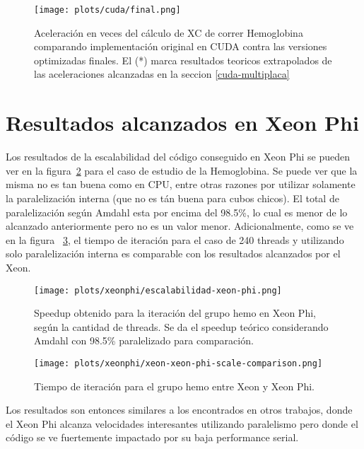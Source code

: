 \begin{figure}[htbp]
   \centering
   \texttt{[image: plots/cuda/final.png]}
   \caption{Aceleraci\'on en veces del c\'alculo de XC de correr Hemoglobina comparando implementaci\'on original en CUDA contra
   las versiones optimizadas finales. El (*) marca resultados teoricos extrapolados de las
 aceleraciones alcanzadas en la seccion \ref{cuda-multiplaca}}
   \label{fig:cuda-final}
\end{figure}


\section{Resultados alcanzados en Xeon Phi}

Los resultados de la escalabilidad del c\'odigo conseguido en Xeon Phi se pueden ver
en la figura~\ref{fig:xeon-final-scalability} para el caso de estudio de la Hemoglobina.
Se puede ver que la misma no es tan buena como en CPU, entre otras razones por utilizar
solamente la paralelizaci\'on interna (que no es t\'an buena para cubos chicos). El total de paralelizaci\'on seg\'un
Amdahl esta por encima del 98.5\%, lo cual es menor de lo alcanzado anteriormente
pero no es un valor menor. Adicionalmente, como se ve en la figura
~\ref{fig:xeon-xeon-phi-parallelized-iteration}, el tiempo de iteraci\'on
para el caso de 240 threads y utilizando solo paralelizaci\'on interna es
comparable con los resultados alcanzados por el Xeon.

\begin{figure}[htbp]
   \centering
   \texttt{[image: plots/xeonphi/escalabilidad-xeon-phi.png]}
   \caption{Speedup obtenido para la iteraci\'on del grupo hemo en Xeon Phi,
   seg\'un la cantidad de threads. Se da el speedup te\'orico considerando Amdahl
   con 98.5\% paralelizado para comparaci\'on.}
   \label{fig:xeon-final-scalability}
\end{figure}

\begin{figure}[htbp]
   \centering
   \texttt{[image: plots/xeonphi/xeon-xeon-phi-scale-comparison.png]}
   \caption{Tiempo de iteraci\'on para el grupo hemo entre Xeon y Xeon Phi.}
   \label{fig:xeon-xeon-phi-parallelized-iteration}
\end{figure}

Los resultados son entonces similares a los encontrados en otros trabajos,
donde el Xeon Phi alcanza velocidades interesantes utilizando paralelismo
pero donde el c\'odigo se ve fuertemente impactado por su baja performance serial.

